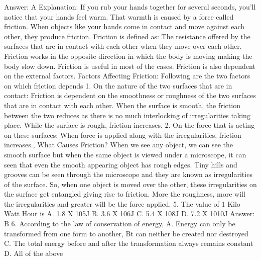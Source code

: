 Answer: A
Explanation: If you rub your hands together for several seconds, you'll notice that your hands feel warm. That warmth is caused by a force called friction. When objects like your hands come in contact and move against each other, they produce friction. Friction is defined as: The resistance offered by the surfaces that are in contact with each other when they move over each other. Friction works in the opposite direction in which the body is moving making the body slow down. Friction is useful in most of the cases. Friction is also dependent on the external factors. Factors Affecting Friction: Following are the two factors on which friction depends 1. On the nature of the two surfaces that are in contact: Friction is dependent on the smoothness or roughness of the two surfaces that are in contact with each other. When the surface is smooth, the friction between the two reduces as there is no much interlocking of irregularities taking place. While the surface is rough, friction increases. 2. On the force that is acting on these surfaces: When force is applied along with the irregularities, friction increases.,  What Causes Friction? When we see any object, we can see the smooth surface but when the same object is viewed under a microscope, it can seen that even the smooth appearing object has rough edges. Tiny hills and grooves can be seen through the microscope and they are known as irregularities of the surface. So, when one object is moved over the other, these irregularities on the surface get entangled giving rise to friction. More the roughness, more will the irregularities and greater will be the force applied. 5. The value of 1 Kilo Watt Hour is A. 1.8 X 105J B. 3.6 X 106J C. 5.4 X 108J D. 7.2 X 1010J 
Answer: B 6. According to the law of conservation of energy, A. Energy can only be transformed from one form to 
another,  Bt can neither be created nor destroyed C. The total energy before and after the transformation always remains constant D. All of the above 

